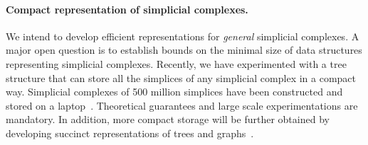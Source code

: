 \paragraph{Compact representation of simplicial complexes.}  We intend to develop efficient representations for {\em general} simplicial complexes. 
A major open question is to establish bounds on the minimal size of data structures representing simplicial complexes.
 Recently, we have experimented with a tree structure that can store all the simplices of any simplicial complex in a compact way. Simplicial complexes of 500 million simplices have been constructed and stored on a laptop~\cite{bm-dssc-2012}.  Theoretical guarantees and large scale experimentations are mandatory. In addition, more compact storage will be further obtained by developing succinct representations of trees and graphs~\cite{Ferragina:2005:SLT:1097112.1097456,Munro:2002:SRB:586840.586885}. 










